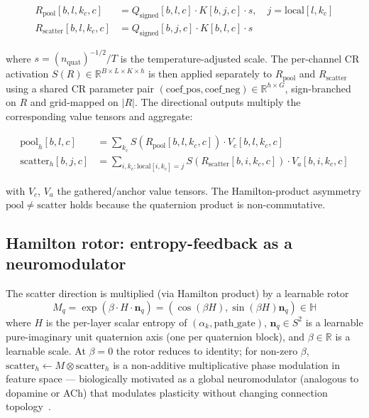 \documentclass[10pt,a4paper]{article}
\begin{document}
\begin{align}
R_{\text{pool}}[b, l, k_c, c]
  &= Q_{\text{signed}}[b, l, c] \cdot K[b, j, c] \cdot s,
  \quad j = \mathrm{local}[l, k_c]\\
R_{\text{scatter}}[b, l, k_c, c]
  &= Q_{\text{signed}}[b, j, c] \cdot K[b, l, c] \cdot s
\end{align}

where $s = (n_{\text{quat}})^{-1/2} / T$ is the temperature-adjusted
scale. The per-channel CR activation $S(R) \in \mathbb{R}^{B \times L \times K \times h}$
is then applied separately to $R_{\text{pool}}$ and $R_{\text{scatter}}$
using a shared CR parameter pair $(\mathrm{coef\_pos}, \mathrm{coef\_neg}) \in \mathbb{R}^{h \times G}$,
sign-branched on $R$ and grid-mapped on $|R|$. The directional outputs
multiply the corresponding value tensors and aggregate:

\begin{align}
\mathrm{pool}_h[b, l, c]
  &= \sum_{k_c} S(R_{\text{pool}}[b,l,k_c,c]) \cdot V_c[b,l,k_c,c]\\
\mathrm{scatter}_h[b, j, c]
  &= \sum_{i, k_c: \mathrm{local}[i,k_c]=j}
     S(R_{\text{scatter}}[b,i,k_c,c]) \cdot V_a[b,i,k_c,c]
\end{align}

with $V_c$, $V_a$ the gathered/anchor value tensors. The Hamilton-product
asymmetry $\mathrm{pool} \ne \mathrm{scatter}$ holds because the quaternion
product is non-commutative.

\subsection{Hamilton rotor: entropy-feedback as a neuromodulator}

The scatter direction is multiplied (via Hamilton product) by a
learnable rotor
\begin{equation}
M_q = \exp(\beta \cdot H \cdot \mathbf{n}_q)
    = (\cos(\beta H), \sin(\beta H) \mathbf{n}_q) \in \mathbb{H}
\end{equation}
where $H$ is the per-layer scalar entropy of $(\alpha_k, \text{path\_gate})$,
$\mathbf{n}_q \in S^2$ is a learnable pure-imaginary unit quaternion
axis (one per quaternion block), and $\beta \in \mathbb{R}$ is a
learnable scale. At $\beta = 0$ the rotor reduces to identity; for
non-zero $\beta$, $\mathrm{scatter}_h \gets M \otimes \mathrm{scatter}_h$
is a non-additive multiplicative phase modulation in feature space ---
biologically motivated as a global neuromodulator (analogous to dopamine
or ACh) that modulates plasticity without changing connection
topology~\cite{schultz1997dopamine, fremaux2016three}.
\end{document}
